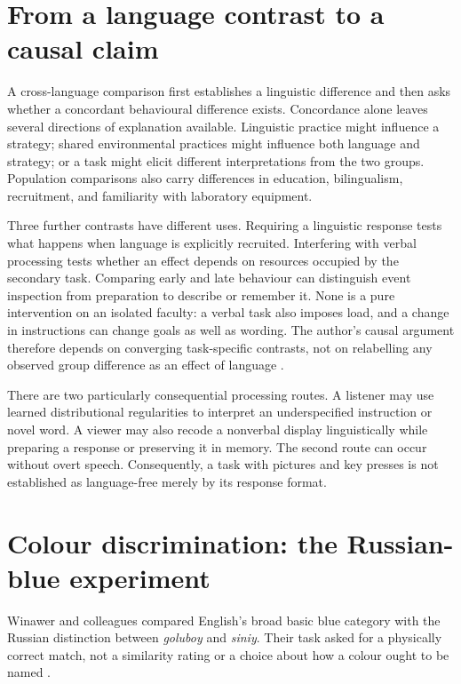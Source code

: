 \section{From a language contrast to a causal claim}
\label{sec:p19-lc-identification}

A cross-language comparison first establishes a linguistic difference and
then asks whether a concordant behavioural difference exists. Concordance
alone leaves several directions of explanation available. Linguistic
practice might influence a strategy; shared environmental practices might
influence both language and strategy; or a task might elicit different
interpretations from the two groups. Population comparisons also carry
differences in education, bilingualism, recruitment, and familiarity with
laboratory equipment.

Three further contrasts have different uses. Requiring a linguistic response
tests what happens when language is explicitly recruited. Interfering with
verbal processing tests whether an effect depends on resources occupied by
the secondary task. Comparing early and late behaviour can distinguish
event inspection from preparation to describe or remember it. None is a
pure intervention on an isolated faculty: a verbal task also imposes load,
and a change in instructions can change goals as well as wording.
The author's causal argument therefore depends on converging task-specific
contrasts, not on relabelling any observed group difference as an effect
of language \cite[author-draft pp.~57--60]{GleitmanPapafragouLanguageThoughtAuthorDraftLC}.

There are two particularly consequential processing routes. A listener may
use learned distributional regularities to interpret an underspecified
instruction or novel word. A viewer may also recode a nonverbal display
linguistically while preparing a response or preserving it in memory.
The second route can occur without overt speech. Consequently, a task
with pictures and key presses is not established as language-free merely
by its response format.

\section{Colour discrimination: the Russian-blue experiment}
\label{sec:p19-lc-colour}

Winawer and colleagues compared English's broad basic blue category with
the Russian distinction between \emph{goluboy} and \emph{siniy}.
Their task asked for a physically correct match, not a similarity rating
or a choice about how a colour ought to be named
\cite[pp.~7780--7785]{WinawerEtAl2007RussianBluesLC}.

